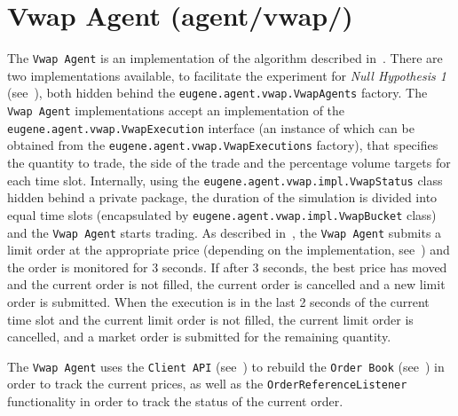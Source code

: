 \section{Vwap Agent (agent/vwap/)}
\label{Chapters/Implementation/Vwap-Agent}
The \texttt{Vwap Agent} is an implementation of the algorithm described in~. There are two implementations available, to facilitate the experiment for \textit{Null Hypothesis 1} (see~), both hidden behind the \texttt{eugene.agent.vwap.VwapAgents} factory. The \texttt{Vwap Agent} implementations accept an implementation of the \\ \texttt{eugene.agent.vwap.VwapExecution} interface (an instance of which can be obtained from the \texttt{eugene.agent.vwap.VwapExecutions} factory), that specifies the quantity to trade, the side of the trade and the percentage volume targets for each time slot. Internally, using  the \texttt{eugene.agent.vwap.impl.VwapStatus} class hidden behind a private package, the duration of the simulation is divided into equal time slots (encapsulated by \texttt{eugene.agent.vwap.impl.VwapBucket} class) and the \texttt{Vwap Agent} starts trading. As described in~, the \texttt{Vwap Agent} submits a limit order at the appropriate price (depending on the implementation, see~) and the order is monitored for 3 seconds. If after 3 seconds, the best price has moved and the current order is not filled, the current order is cancelled and a new limit order is submitted. When the execution is in the last 2 seconds of the current time slot and the current limit order is not filled, the current limit order is cancelled, and a market order is submitted for the remaining quantity.

The \texttt{Vwap Agent} uses the \texttt{Client API} (see~) to rebuild the \texttt{Order Book} (see~) in order to track the current prices, as well as the \texttt{OrderReferenceListener} functionality in order to track the status of the current order.
